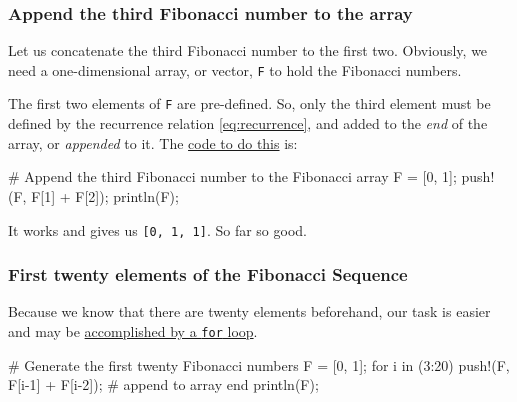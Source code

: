 \documentclass[
  a4paper,
]{article}
\newenvironment{Shaded}{\begin{snugshade}}{\end{snugshade}}
\newcommand{\CommentTok}[1]{\textcolor[rgb]{0.50,0.62,0.50}{#1}}
\newcommand{\ControlFlowTok}[1]{\textcolor[rgb]{0.94,0.87,0.69}{#1}}
\newcommand{\FloatTok}[1]{\textcolor[rgb]{0.75,0.75,0.82}{#1}}
\newcommand{\FunctionTok}[1]{\textcolor[rgb]{0.94,0.94,0.56}{#1}}
\newcommand{\KeywordTok}[1]{\textcolor[rgb]{0.94,0.87,0.69}{#1}}
\newcommand{\NormalTok}[1]{\textcolor[rgb]{0.80,0.80,0.80}{#1}}
\newcommand{\OperatorTok}[1]{\textcolor[rgb]{0.94,0.94,0.82}{#1}}
\begin{document}
\hypertarget{append-the-third-fibonacci-number-to-the-array}{%
\subsubsection{Append the third Fibonacci number to the
array}\label{append-the-third-fibonacci-number-to-the-array}}

Let us concatenate the third Fibonacci number to the first two.
Obviously, we need a one-dimensional array, or vector, \texttt{F} to
hold the Fibonacci numbers.

The first two elements of \texttt{F} are pre-defined. So, only the third
element must be defined by the recurrence relation \cref{eq:recurrence},
and added to the \emph{end} of the array, or \emph{appended} to it. The
\href{first-three.jl}{code to do this} is:

\begin{Shaded}
\begin{Highlighting}[]
\CommentTok{\# Append the third Fibonacci number to the Fibonacci array}
\NormalTok{F }\OperatorTok{=}\NormalTok{ [}\FloatTok{0}\NormalTok{, }\FloatTok{1}\NormalTok{];}
\FunctionTok{push!}\NormalTok{(F, F[}\FloatTok{1}\NormalTok{] }\OperatorTok{+}\NormalTok{ F[}\FloatTok{2}\NormalTok{]);}
\FunctionTok{println}\NormalTok{(F);}
\end{Highlighting}
\end{Shaded}

It works and gives us \texttt{{[}0,\ 1,\ 1{]}}. So far so good.

\hypertarget{first-twenty-elements-of-the-fibonacci-sequence}{%
\subsubsection{First twenty elements of the Fibonacci
Sequence}\label{first-twenty-elements-of-the-fibonacci-sequence}}

Because we know that there are twenty elements beforehand, our task is
easier and may be \href{auxiliary/first-twenty.jl}{accomplished by a
\texttt{for} loop}.

\begin{Shaded}
\begin{Highlighting}[]
\CommentTok{\# Generate the first twenty Fibonacci numbers}
\NormalTok{F }\OperatorTok{=}\NormalTok{ [}\FloatTok{0}\NormalTok{, }\FloatTok{1}\NormalTok{];}
\ControlFlowTok{for}\NormalTok{ i }\KeywordTok{in}\NormalTok{ (}\FloatTok{3}\OperatorTok{:}\FloatTok{20}\NormalTok{)}
  \FunctionTok{push!}\NormalTok{(F, F[i}\OperatorTok{{-}}\FloatTok{1}\NormalTok{] }\OperatorTok{+}\NormalTok{ F[i}\OperatorTok{{-}}\FloatTok{2}\NormalTok{]); }\CommentTok{\# append to array}
\ControlFlowTok{end}
\FunctionTok{println}\NormalTok{(F);}
\end{Highlighting}
\end{Shaded}
\end{document}
